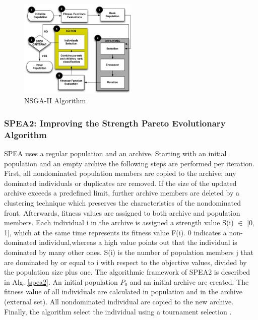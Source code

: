 \documentclass[espaco=umemeio,chapter=TITLE,twoside,openright]{abnt}
\begin{document}
\begin{figure}[h]
\centering
\includegraphics[width=0.5\textwidth]{./images/NSGA-2.png}
\caption{NSGA-II Algorithm}
\label{fig:nsga2}
\end{figure}

\subsubsection{SPEA2: Improving the Strength Pareto Evolutionary Algorithm}

SPEA uses a regular population and an archive. Starting with an initial population and an empty archive the following steps are performed per iteration. First, all nondominated population members are copied to the archive; any dominated individuals or duplicates are removed. If the size of the updated archive exceeds a predefined limit, further archive members are deleted by a clustering technique which preserves the characteristics of the nondominated front. Afterwards, fitness values are assigned to both archive and population members. Each individual i in the archive is assigned a strength value S(i) $\in$ [0, 1], which at the same time represents its fitness value F(i). 0 indicates a non-dominated individual,whereas a high value points out that the individual is dominated by many other ones. S(i) is the number of population members j that are dominated by or equal to i with respect to the objective values, divided by the population size plus one. The algorithmic framework of SPEA2 is described in Alg. \ref{spea2}. An initial population $P_{0}$ and an initial archive are created. The fitness value of all individuals are calculated in population and in the archive (external set). All nondominated individual are copied to the new archive. Finally, the algorithm select the individual using a tournament selection \cite{Zitzler2001} \cite{Tervonen2017} \cite{MatneiFilho2016}.
\end{document}
